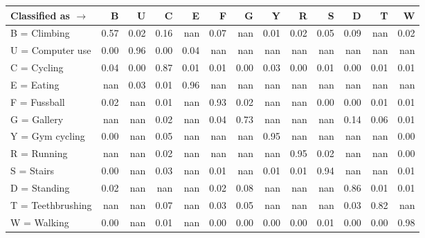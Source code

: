 \begin{tabular}{lrrrrrrrrrrrr}
\toprule
Classified as $\rightarrow$ &    B &    U &    C &    E &    F &    G &    Y &    R &    S &    D &    T &    W \\
\midrule
B = Climbing      & 0.57 & 0.02 & 0.16 &  nan & 0.07 &  nan & 0.01 & 0.02 & 0.05 & 0.09 &  nan & 0.02 \\
U = Computer use  & 0.00 & 0.96 & 0.00 & 0.04 &  nan &  nan &  nan &  nan &  nan &  nan &  nan &  nan \\
C = Cycling       & 0.04 & 0.00 & 0.87 & 0.01 & 0.01 & 0.00 & 0.03 & 0.00 & 0.01 & 0.00 & 0.01 & 0.01 \\
E = Eating        &  nan & 0.03 & 0.01 & 0.96 &  nan &  nan &  nan &  nan &  nan &  nan &  nan &  nan \\
F = Fussball      & 0.02 &  nan & 0.01 &  nan & 0.93 & 0.02 &  nan &  nan & 0.00 & 0.00 & 0.01 & 0.01 \\
G = Gallery       &  nan &  nan & 0.02 &  nan & 0.04 & 0.73 &  nan &  nan &  nan & 0.14 & 0.06 & 0.01 \\
Y = Gym cycling   & 0.00 &  nan & 0.05 &  nan &  nan &  nan & 0.95 &  nan &  nan &  nan &  nan & 0.00 \\
R = Running       &  nan &  nan & 0.02 &  nan &  nan &  nan &  nan & 0.95 & 0.02 &  nan &  nan & 0.00 \\
S = Stairs        & 0.00 &  nan & 0.03 &  nan & 0.01 &  nan & 0.01 & 0.01 & 0.94 &  nan &  nan & 0.01 \\
D = Standing      & 0.02 &  nan &  nan &  nan & 0.02 & 0.08 &  nan &  nan &  nan & 0.86 & 0.01 & 0.01 \\
T = Teethbrushing &  nan &  nan & 0.07 &  nan & 0.03 & 0.05 &  nan &  nan &  nan & 0.03 & 0.82 &  nan \\
W = Walking       & 0.00 &  nan & 0.01 &  nan & 0.00 & 0.00 & 0.00 & 0.00 & 0.01 & 0.00 & 0.00 & 0.98 \\
\bottomrule
\end{tabular}
